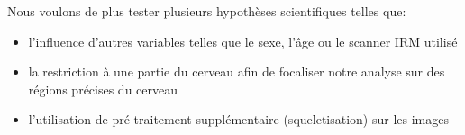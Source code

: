 Nous voulons de plus tester plusieurs hypothèses scientifiques telles que:
\begin{itemize}
	\item l'influence d'autres variables telles que le sexe, l'âge ou le scanner IRM utilisé
	\item la restriction à une partie du cerveau afin de focaliser notre analyse sur des régions précises du cerveau
	\item l'utilisation de pré-traitement supplémentaire (squeletisation) sur les images
\end{itemize}

% 
